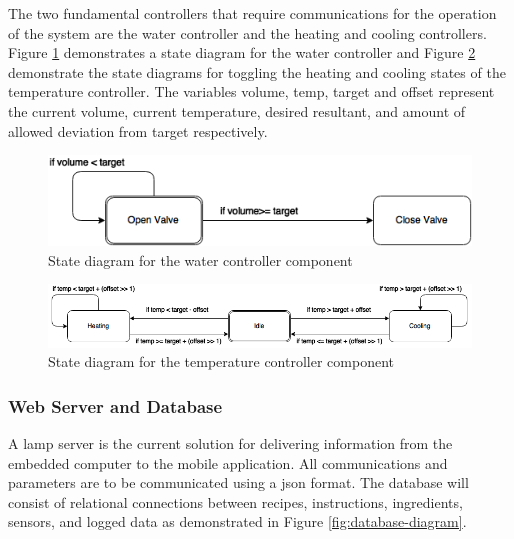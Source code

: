 \documentclass{article}
\begin{document}
The two fundamental controllers that require communications for the operation of the system are the water controller and the heating and cooling controllers.  Figure \ref{fig:water-controller} demonstrates a state diagram for the water controller and Figure \ref{fig:temperature-controller} demonstrate the state diagrams for toggling the heating and cooling states of the temperature controller.  The variables volume, temp, target and offset represent the current volume, current temperature, desired resultant, and amount of allowed deviation from target respectively.

\begin{figure}[H]
\begin{center}
\includegraphics[scale=0.50]{water-controller-state-diagram.png}
\caption{State diagram for the water controller component}
\label{fig:water-controller}
\end{center}
\end{figure}

\begin{figure}[H]
\begin{center}
\includegraphics[scale=0.50]{temperature-controller-state-diagram.png}
\caption{State diagram for the temperature controller component}
\label{fig:temperature-controller}
\end{center}
\end{figure}

\subsubsection{Web Server and Database}
A \gls{lamp} server is the current solution for delivering information from the embedded computer to the mobile application.  All communications and parameters are to be communicated using a \gls{json} format.  The database will consist of relational connections between recipes, instructions, ingredients, sensors, and logged data as demonstrated in Figure \ref{fig:database-diagram}.
\end{document}
